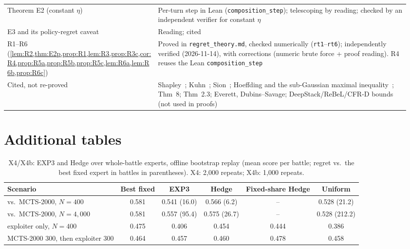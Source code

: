 \documentclass[10pt]{article}
\theoremstyle{plain}
\theoremstyle{definition}
\theoremstyle{remark}
\begin{document}
\begin{table}[h]
\begin{tabular}{@{}p{0.36\linewidth}p{0.6\linewidth}@{}}
Theorem E2 (constant $\eta$) & Per-turn step in Lean (\texttt{composition\_step}); telescoping by reading; checked by an independent verifier for constant $\eta$ \\
E3 and its policy-regret caveat & Reading; cited~\cite{Aro12b} \\
R1--R6 (\cref{lem:R2,thm:E2p,prop:R1,lem:R3,prop:R3c,cor:R4,prop:R5a,prop:R5b,prop:R5c,lem:R6a,lem:R6b,prop:R6c}) & Proved in \texttt{regret\_theory.md}, checked numerically (\texttt{rt1}--\texttt{rt6}); independently verified (2026-11-14), with corrections (numeric brute force + proof reading). R4 reuses the Lean \texttt{composition\_step} \\
Cited, not re-proved & Shapley~\cite{Shapley53}; Kuhn~\cite{Kuhn53}; Sion~\cite{Sion58}; Hoeffding and the sub-Gaussian maximal inequality~\cite{BLM13}; \cite{BMS19} Thm~8; \cite{CBL06} Thm~2.3; Everett, Dubins--Savage; DeepStack/ReBeL/CFR-D bounds (not used in proofs) \\
\bottomrule
\end{tabular}
\end{table}

\section{Additional tables}
\label{app:tables}
\begin{table}[h]
\centering\small
\caption{X4/X4b: EXP3 and Hedge over whole-battle experts, offline bootstrap replay (mean score per battle; regret vs.\ the best fixed expert in battles in parentheses). X4: 2,000 repeats; X4b: 1,000 repeats.}
\label{tab:x4}
\begin{tabular}{@{}lccccc@{}}
\toprule
Scenario & Best fixed & EXP3 & Hedge & Fixed-share Hedge & Uniform \\
\midrule
vs.\ MCTS-2000, $N=400$ & 0.581 & 0.541 (16.0) & 0.566 (6.2) & -- & 0.528 (21.2) \\
vs.\ MCTS-2000, $N=4{,}000$ & 0.581 & 0.557 (95.4) & 0.575 (26.7) & -- & 0.528 (212.2) \\
exploiter only, $N=400$ & 0.475 & 0.406 & 0.454 & 0.444 & 0.386 \\
MCTS-2000 300, then exploiter 300 & 0.464 & 0.457 & 0.460 & 0.478 & 0.458 \\
\bottomrule
\end{tabular}
\end{table}
\end{document}
